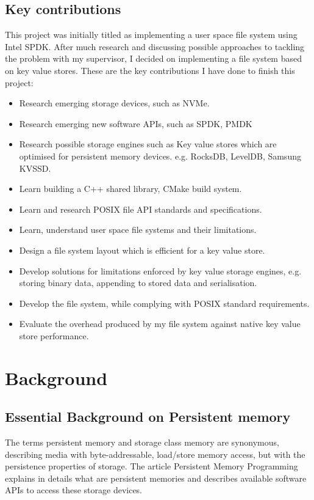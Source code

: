 \documentclass[bsc,frontabs,twoside,singlespacing,parskip,deptreport]{infthesis}     %
\begin{document}
\section{Key contributions}
This project was initially titled as implementing a user space file system using Intel SPDK\cite{spdk}. After much research and discussing possible approaches to tackling the problem with my supervisor, I decided on implementing a file system based on key value stores. These are the key contributions I have done to finish this project:
\begin{itemize}
	\item Research emerging storage devices, such as NVMe\cite{wiki:NVM}.
	\item Research emerging new software APIs, such as SPDK\cite{spdk}, PMDK\cite{pmdk}
	\item Research possible storage engines such as Key value stores which are optimised for persistent memory devices. e.g. RocksDB\cite{rocksdb}, LevelDB\cite{leveldb}, Samsung KVSSD\cite{samsung_kv_ssd}.
	\item Learn building a C++ shared library, CMake build system.
	\item Learn and research POSIX\cite{POSIX} file API standards and specifications.
	\item Learn, understand user space file systems and their limitations.
	\item Design a file system layout which is efficient for a key value store.
	\item Develop solutions for limitations enforced by key value storage engines, e.g. storing binary data, appending to stored data and serialisation.
	\item Develop the file system, while complying with POSIX standard requirements.
	\item Evaluate the overhead produced by my file system against native key value store performance.
\end{itemize}

\chapter{Background}
\section{Essential Background on Persistent memory}
The terms persistent memory and storage class memory are synonymous, describing media with byte-addressable, load/store memory access, but with the persistence properties of storage.
The article Persistent Memory Programming \cite{PMP} explains in details what are persistent memories and describes available software APIs to access these storage devices.
\end{document}
